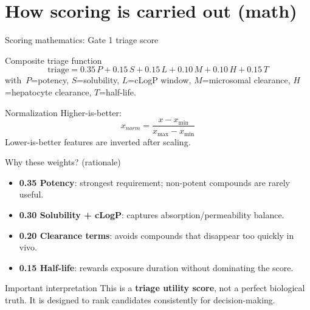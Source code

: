 \documentclass[aspectratio=169,10pt]{beamer}
\begin{document}
\section{How scoring is carried out (math)}

\begin{frame}{Scoring mathematics: Gate 1 triage score}
  \small
  \begin{block}{Composite triage function}
  \[
  \text{triage} = 0.35\,P + 0.15\,S + 0.15\,L + 0.10\,M + 0.10\,H + 0.15\,T
  \]
  with\
  \(P\)=potency, \(S\)=solubility, \(L\)=cLogP window,
  \(M\)=microsomal clearance, \(H\)=hepatocyte clearance,
  \(T\)=half-life.
  \end{block}

  \begin{exampleblock}{Normalization}
  Higher-is-better:
  \[
  x_{norm}=\frac{x-x_{\min}}{x_{\max}-x_{\min}}
  \]
  Lower-is-better features are inverted after scaling.
  \end{exampleblock}
\end{frame}

\begin{frame}{Why these weights? (rationale)}
  \begin{itemize}
    \item \textbf{0.35 Potency}: strongest requirement; non-potent compounds are rarely useful.
    \item \textbf{0.30 Solubility + cLogP}: captures absorption/permeability balance.
    \item \textbf{0.20 Clearance terms}: avoids compounds that disappear too quickly in vivo.
    \item \textbf{0.15 Half-life}: rewards exposure duration without dominating the score.
  \end{itemize}

  \vspace{4pt}
  \begin{alertblock}{Important interpretation}
    This is a \textbf{triage utility score}, not a perfect biological truth.
    It is designed to rank candidates consistently for decision-making.
  \end{alertblock}
\end{frame}
\end{document}
